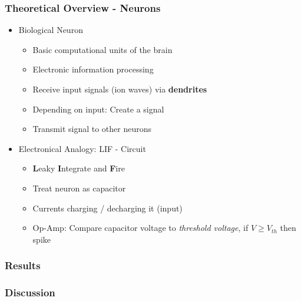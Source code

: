 \documentclass{beamer}
\begin{document}
\begin{frame}
    \frametitle{Theoretical Overview - Neurons}
   	\begin{itemize}
   		\item Biological Neuron
   		\begin{itemize}
   			\item Basic computational units of the brain
   			\item Electronic information processing
   			\item Receive input signals (ion waves) via \textbf{dendrites}
   			\item Depending on input: Create a signal
   			\item Transmit signal to other neurons
   		\end{itemize}
   		
   		\item Electronical Analogy: LIF - Circuit
   		\begin{itemize}
   			\item \textbf{L}eaky \textbf{I}ntegrate and \textbf{F}ire
   			\item Treat neuron as capacitor
   			\item Currents charging / decharging it (input)
   			\item Op-Amp: Compare capacitor voltage to \textit{threshold voltage},  if $V\geq V_{th}$ then spike
   		\end{itemize}
   	\end{itemize}
\end{frame}

\begin{frame}
    \frametitle{Results}
\end{frame}

\begin{frame}
    \frametitle{Discussion}
\end{frame}
\end{document}
